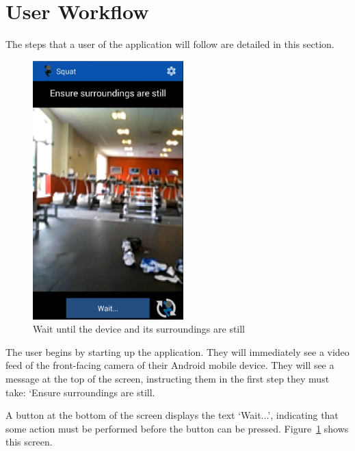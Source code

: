 \section{User Workflow}

The steps that a user of the application will follow are detailed in this section.

\begin{figure}[H]
    \centering
	\includegraphics[height=10cm]{application/images/ensuresurroundingsstill}
\caption{Wait until the device and its surroundings are still}
\label{fig:ensuresurroundings}
\end{figure}

The user begins by starting up the application. They will immediately see a video feed of the front-facing camera of their Android mobile device. They will see a message at the top of the screen, instructing them in the first step they must take: `Ensure surroundings are still.

A button at the bottom of the screen displays the text `Wait...', indicating that some action must be performed before the button can be pressed. Figure~\ref{fig:ensuresurroundings} shows this screen.

